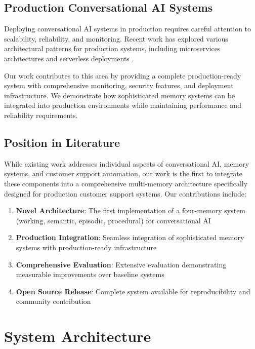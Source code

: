 \documentclass[11pt]{article}
\begin{document}
\subsection{Production Conversational AI Systems}

Deploying conversational AI systems in production requires careful attention to scalability, reliability, and monitoring. Recent work has explored various architectural patterns for production systems, including microservices architectures \cite{newman2021building} and serverless deployments \cite{burns2019kubernetes}.

Our work contributes to this area by providing a complete production-ready system with comprehensive monitoring, security features, and deployment infrastructure. We demonstrate how sophisticated memory systems can be integrated into production environments while maintaining performance and reliability requirements.

\subsection{Position in Literature}

While existing work addresses individual aspects of conversational AI, memory systems, and customer support automation, our work is the first to integrate these components into a comprehensive multi-memory architecture specifically designed for production customer support systems. Our contributions include:

\begin{enumerate}
\item \textbf{Novel Architecture}: The first implementation of a four-memory system (working, semantic, episodic, procedural) for conversational AI
\item \textbf{Production Integration}: Seamless integration of sophisticated memory systems with production-ready infrastructure
\item \textbf{Comprehensive Evaluation}: Extensive evaluation demonstrating measurable improvements over baseline systems
\item \textbf{Open Source Release}: Complete system available for reproducibility and community contribution
\end{enumerate}

\section{System Architecture}
\end{document}
